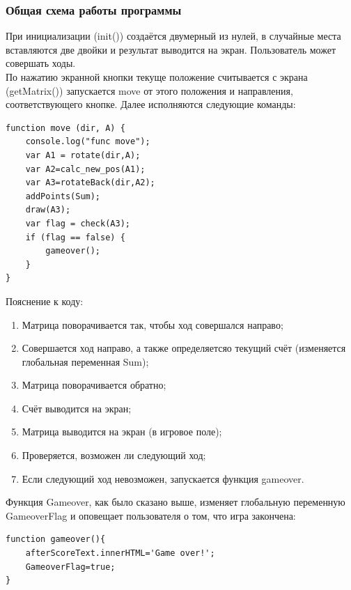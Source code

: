 \documentclass[a4paper,12pt]{article}
\begin{document}
\subsubsection{Общая схема работы программы}
При инициализации (init()) создаётся двумерный из нулей, в случайные места вставляются две двойки и результат выводится на экран. Пользователь может совершать ходы.\\
По нажатию экранной кнопки текуще положение считывается с экрана (getMatrix()) запускается move от этого положения и направления, соответствующего кнопке. Далее исполняются следующие команды:\\
\begin{lstlisting}
function move (dir, A) {
	console.log("func move");
	var A1 = rotate(dir,A);
	var A2=calc_new_pos(A1);
	var A3=rotateBack(dir,A2);
	addPoints(Sum);
	draw(A3);
	var flag = check(A3);
	if (flag == false) {
		gameover();
	}
} 
\end{lstlisting}
Пояснение к коду: 
\begin{enumerate}
\item{} Матрица поворачивается так, чтобы ход совершался направо;
\item{} Совершается ход направо, а также определяетсяо текущий счёт (изменяется глобальная переменная Sum);
\item{} Матрица поворачивается обратно;
\item{} Счёт выводится на экран;
\item{} Матрица выводится на экран (в игровое поле);
\item{} Проверяется, возможен ли следующий ход;
\item{} Если следующий ход невозможен, запускается функция gameover.
\end{enumerate}
Функция Gameover, как было сказано выше, изменяет глобальную переменную GameoverFlag и оповещает пользователя о том, что игра закончена:
\begin{lstlisting}
function gameover(){
	afterScoreText.innerHTML='Game over!';
	GameoverFlag=true;
}
\end{lstlisting}
\end{document}
